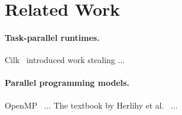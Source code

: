 \section{Related Work}
\label{sec:related}

\paragraph{Task-parallel runtimes.}
Cilk~\cite{blumofe1995cilk} introduced work stealing ...

\paragraph{Parallel programming models.}
OpenMP~\cite{dagum1998openmp} ... The textbook by
Herlihy et al.~\cite{herlihy2020art} ...
